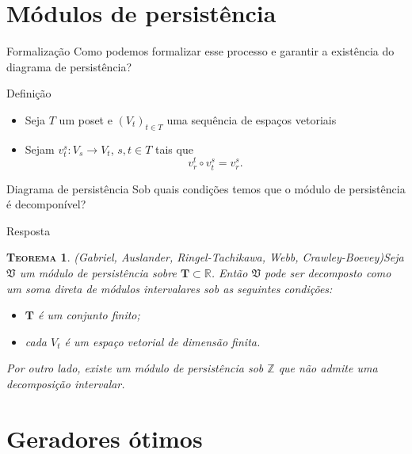 \documentclass[10pt]{beamer}
\newtheorem{teo}{\scshape Teorema}
\begin{document}
\section{Módulos de persistência}

\begin{frame}{Formalização}
    \centering
    {\Large Como podemos formalizar esse processo e garantir a existência
    do diagrama de persistência?}
\end{frame} 

\begin{frame}{Definição}
    \begin{itemize}
        \item Seja $T$ um poset e $(V_t)_{t \in T}$ uma sequência de espaços vetoriais
        \item Sejam $v_t^s \colon V_s \to V_t$, $s,t \in T$ tais que 
                \begin{equation*}
                    v^t_r \circ v^s_t = v^s_r.
                \end{equation*}
    \end{itemize}
\end{frame}

\begin{frame}{Diagrama de persistência}
    \centering
    {\Large Sob quais condições temos que o módulo de persistência é decomponível?} 
\end{frame}

\begin{frame}{Resposta}
    \begin{teo}{(Gabriel, Auslander, Ringel-Tachikawa, Webb, Crawley-Boevey)}\label{teo:crawley}
    Seja $\mathfrak{V}$ um módulo de persistência sobre $\mathbf{T} \subset \mathbb{R}$. Então $\mathfrak{V}$
    pode ser decomposto como um soma direta de módulos intervalares sob as seguintes condições:
    \begin{itemize} 
        \item $\mathbf{T}$ é um conjunto finito;
        \item cada $V_t$ é um espaço vetorial de dimensão finita. 
    \end{itemize}
    Por outro lado, existe um módulo de persistência sob $\mathbb{Z}$ que não admite uma decomposição intervalar. 
\end{teo}  
\end{frame}

\section{Geradores ótimos} 
\end{document}
